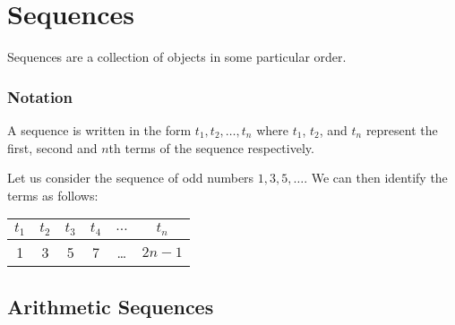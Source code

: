 \section{Sequences}

Sequences are a collection of objects in some particular order.

\subsubsection{Notation}

A sequence is written in the form $t_1, t_2, \dots, t_n$ where $t_1$, $t_2$, and $t_n$ represent the first, second and $n$th terms of the sequence respectively. \\

\begin{tcolorbox}
Let us consider the sequence of odd numbers $1, 3, 5, \dots$. We can then identify the terms as follows:  

\begin{tabular}{|c|c|c|c|c|c|}
  \hline
  $t_1$ & $t_2$ & $t_3$ & $t_4$ & $\dots$ & $t_n$ \\
  \hline
  1 & 3 & 5 & 7 & \dots & $2n-1$ \\
  \hline
\end{tabular}
\end{tcolorbox}

\subsection{Arithmetic Sequences}



